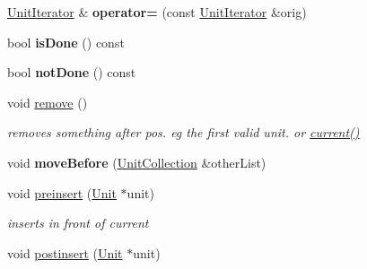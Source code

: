 \begin{DoxyCompactItemize}
\item 
\hyperlink{classUnitCollection_1_1UnitIterator}{Unit\+Iterator} \& {\bfseries operator=} (const \hyperlink{classUnitCollection_1_1UnitIterator}{Unit\+Iterator} \&orig)\hypertarget{classUnitCollection_1_1UnitIterator_aa05c8411c8e6cad3fa1492c6b7d255c2}{}\label{classUnitCollection_1_1UnitIterator_aa05c8411c8e6cad3fa1492c6b7d255c2}

\item 
bool {\bfseries is\+Done} () const \hypertarget{classUnitCollection_1_1UnitIterator_ac7f11f7817aa9f77932cd8b34b9ccde4}{}\label{classUnitCollection_1_1UnitIterator_ac7f11f7817aa9f77932cd8b34b9ccde4}

\item 
bool {\bfseries not\+Done} () const \hypertarget{classUnitCollection_1_1UnitIterator_a29107696019566090d19ac3135b273d3}{}\label{classUnitCollection_1_1UnitIterator_a29107696019566090d19ac3135b273d3}

\item 
void \hyperlink{classUnitCollection_1_1UnitIterator_a0ca88634c0555e345ed98c4b7d974d6b}{remove} ()\hypertarget{classUnitCollection_1_1UnitIterator_a0ca88634c0555e345ed98c4b7d974d6b}{}\label{classUnitCollection_1_1UnitIterator_a0ca88634c0555e345ed98c4b7d974d6b}

\begin{DoxyCompactList}\small\item\em removes something after pos. eg the first valid unit. or \hyperlink{classUnitCollection_1_1UnitIterator_af6ee5f304588c259fac4fc1584428809}{current()} \end{DoxyCompactList}\item 
void {\bfseries move\+Before} (\hyperlink{classUnitCollection}{Unit\+Collection} \&other\+List)\hypertarget{classUnitCollection_1_1UnitIterator_a69098874262367af7f7a42bf523e6035}{}\label{classUnitCollection_1_1UnitIterator_a69098874262367af7f7a42bf523e6035}

\item 
void \hyperlink{classUnitCollection_1_1UnitIterator_aee4894a2d5b0389f15568cae6ce8edd5}{preinsert} (\hyperlink{classUnit}{Unit} $\ast$unit)\hypertarget{classUnitCollection_1_1UnitIterator_aee4894a2d5b0389f15568cae6ce8edd5}{}\label{classUnitCollection_1_1UnitIterator_aee4894a2d5b0389f15568cae6ce8edd5}

\begin{DoxyCompactList}\small\item\em inserts in front of current \end{DoxyCompactList}\item 
void \hyperlink{classUnitCollection_1_1UnitIterator_ae0f0e36af0874a9022ae6775c04b530d}{postinsert} (\hyperlink{classUnit}{Unit} $\ast$unit)\hypertarget{classUnitCollection_1_1UnitIterator_ae0f0e36af0874a9022ae6775c04b530d}{}\label{classUnitCollection_1_1UnitIterator_ae0f0e36af0874a9022ae6775c04b530d}


\end{DoxyCompactItemize}
